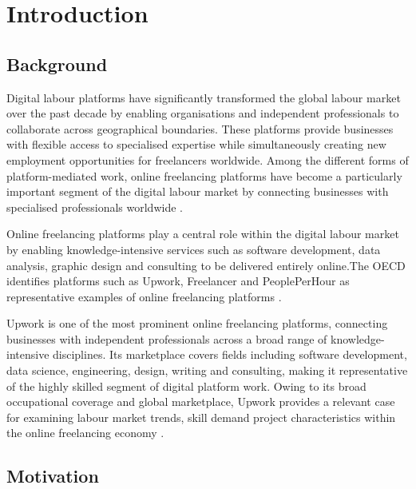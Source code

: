 
\chapter{Introduction}

    \section{Background}

    Digital labour platforms have significantly transformed the global labour market over the past decade by 
    enabling organisations and independent professionals to collaborate across geographical boundaries. 
    These platforms provide businesses with flexible access to specialised expertise while simultaneously creating new 
    employment opportunities for freelancers worldwide. Among the different forms of platform-mediated work, online freelancing platforms 
    have become a particularly important segment of the digital labour market by connecting businesses 
    with specialised professionals worldwide \cite{oecd2023_platformwork,oecd2019_platformworkers}.

    Online freelancing platforms play a central role within the digital labour market by enabling 
    knowledge-intensive services such as software development, data analysis, graphic design and consulting
    to be delivered entirely online.The OECD identifies platforms such as Upwork, Freelancer and PeoplePerHour 
    as representative examples of online freelancing platforms \cite{oecd2023_platformwork}.

    Upwork is one of the most prominent online freelancing platforms, connecting businesses with independent professionals across
    a broad range of knowledge-intensive disciplines. Its marketplace covers fields including software development,
    data science, engineering, design, writing and consulting, making it representative of the highly skilled segment
    of digital platform work. Owing to its broad occupational coverage and global marketplace, Upwork provides a
    relevant case for examining labour market trends, skill demand project characteristics
    within the online freelancing economy \cite{oecd2023_platformwork,upwork2024_gigeconomy}.
    
    \section{Motivation}

